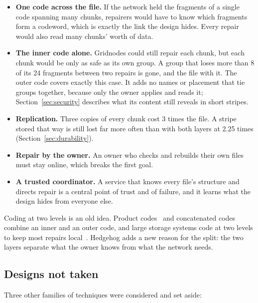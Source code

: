 \documentclass[10pt,a4paper,final]{article}
\begin{document}
\begin{itemize}
	\item \textbf{One code across the file.} If the network held the fragments of a single code spanning many
	      chunks, repairers would have to know which fragments form a codeword, which is exactly the link the design
	      hides. Every repair would also read many chunks' worth of data.
	\item \textbf{The inner code alone.} Gridnodes could still repair each chunk, but each chunk would be only as
	      safe as its own group. A group that loses more than 8 of its 24 fragments between two repairs is gone, and
	      the file with it. The outer code covers exactly this case. It adds no names or placement that tie groups
	      together, because only the owner applies and reads it; Section~\ref{sec:security} describes what its
	      content still reveals in short stripes.
	\item \textbf{Replication.} Three copies of every chunk cost 3 times the file. A stripe stored that way is still
	      lost far more often than with both layers at 2.25 times (Section~\ref{sec:durability}).
	\item \textbf{Repair by the owner.} An owner who checks and rebuilds their own files must stay online, which
	      breaks the first goal.
	\item \textbf{A trusted coordinator.} A service that knows every file's structure and directs repair is a
	      central point of trust and of failure, and it learns what the design hides from everyone else.
\end{itemize}

Coding at two levels is an old idea. Product codes~\cite{elias1954} and concatenated codes~\cite{forney1966}
combine an inner and an outer code, and large storage systems code at two levels to keep most repairs
local~\cite{huang2012,muralidhar2014}. Hedgehog adds a new reason for the split: the two layers separate what the
owner knows from what the network needs.

\subsection{Designs not taken}

Three other families of techniques were considered and set aside:
\end{document}
